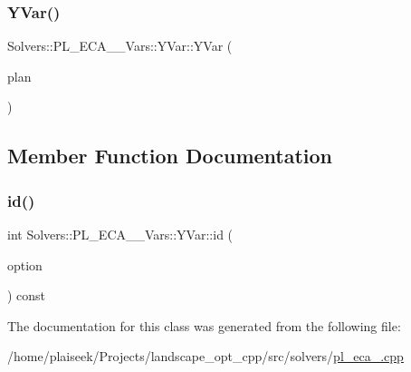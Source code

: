 \subsubsection{\texorpdfstring{Y\+Var()}{YVar()}}
{\footnotesize\ttfamily Solvers\+::\+P\+L\+\_\+\+E\+C\+A\+\_\+\_\+\+Vars\+::\+Y\+Var\+::\+Y\+Var (\begin{DoxyParamCaption}\item[{const \hyperlink{class_restoration_plan}{Restoration\+Plan} \&}]{plan }\end{DoxyParamCaption})\hspace{0.3cm}{\ttfamily [inline]}}



\subsection{Member Function Documentation}
\mbox{\label{class_solvers_1_1_p_l___e_c_a__3___vars_1_1_y_var_a6a16fe1b85ab58f65f957daf5dd22788}} 
\subsubsection{\texorpdfstring{id()}{id()}}
{\footnotesize\ttfamily int Solvers\+::\+P\+L\+\_\+\+E\+C\+A\+\_\+\_\+\+Vars\+::\+Y\+Var\+::id (\begin{DoxyParamCaption}\item[{const \hyperlink{class_restoration_plan_1_1_option}{Restoration\+Plan\+::\+Option} $\ast$}]{option }\end{DoxyParamCaption}) const\hspace{0.3cm}{\ttfamily [inline]}}



The documentation for this class was generated from the following file\+:\begin{DoxyCompactItemize}
\item 
/home/plaiseek/\+Projects/landscape\+\_\+opt\+\_\+cpp/src/solvers/\hyperlink{pl__eca__3_8cpp}{pl\+\_\+eca\+\_.\+cpp}\end{DoxyCompactItemize}
